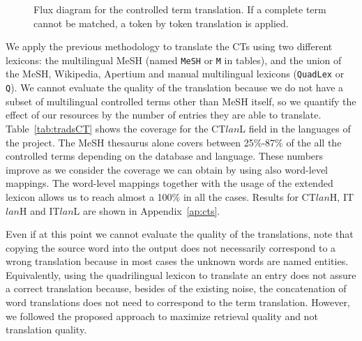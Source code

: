 \documentclass[a4paper,11pt]{article}
\begin{document}
\begin{figure}[t!]
    \caption{Flux diagram for the controlled term translation. If a complete term cannot be matched, a token by token translation is applied.}
    \label{fig:diagram}
\end{figure}

	\bigskip
	We apply the previous methodology to translate the CTs using two different lexicons: the multilingual MeSH (named {\tt MeSH} or {\tt M} in tables), and the union of the MeSH, Wikipedia, Apertium and manual multilingual lexicons ({\tt QuadLex} or {\tt Q}). We cannot evaluate the quality of the translation because we do not have a subset of multilingual controlled terms other than MeSH itself, so we quantify the effect of our resources by the number of entries they are able to translate. Table~\ref{tab:tradsCT} shows the coverage for the CT$lan$L field in the languages of the project. The MeSH thesaurus alone covers between 25\%-87\% of the all the controlled terms depending on the database and language. These numbers improve as we consider the coverage we can obtain by using also word-level mappings. The word-level mappings together with the usage of the extended lexicon allows us to reach almost a 100\% in all the cases. Results for CT$lan$H, IT$lan$H and IT$lan$L are shown in Appendix~\ref{ap:cts}.
	
	Even if at this point we cannot evaluate the quality of the translations, note that copying the source word into the output does not necessarily correspond to a wrong translation because in most cases the unknown words are named entities. Equivalently, using the quadrilingual lexicon to translate an entry does not assure a correct translation because, besides of the existing noise, the concatenation of word translations does not need to correspond to the term translation. However, we followed the proposed approach to maximize retrieval quality and not translation quality. 
	
\end{document}
